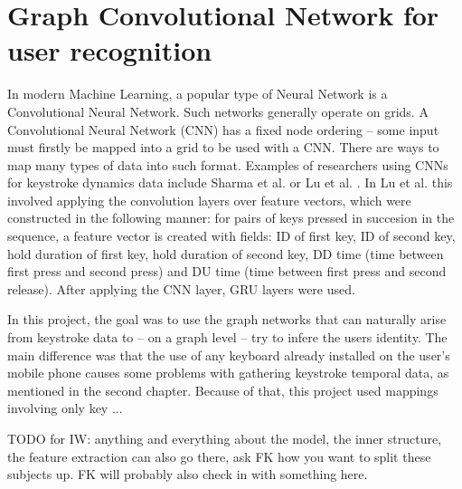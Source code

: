 
\section{Graph Convolutional Network for user recognition}

In modern Machine Learning, a popular type of Neural Network is a Convolutional Neural Network. Such networks generally operate on grids. A Convolutional Neural Network (CNN) has a fixed node ordering -- some input must firstly be mapped into a grid to be used with a CNN. There are ways to map many types of data into such format. Examples of researchers using CNNs for keystroke dynamics data include Sharma et al. \cite{Shar2023} or Lu et al. \cite{Lu2020}. In Lu et al. this involved applying the convolution layers over feature vectors, which were constructed in the following manner: for pairs of keys pressed in succesion in the sequence, a feature vector is created with fields: ID of first key, ID of second key, hold duration of first key, hold duration of second key, DD time (time between first press and second press) and DU time (time between first press and second release). After applying the CNN layer, GRU layers were used.

In this project, the goal was to use the graph networks that can naturally arise from keystroke data to -- on a graph level -- try to infere the users identity. The main difference was that the use of any keyboard already installed on the user's mobile phone causes some problems with gathering keystroke temporal data, as mentioned in the second chapter. Because of that, this project used mappings involving only key ...

TODO for IW: anything and everything about the model, the inner structure, the feature extraction can also go there, ask FK how you want to split these subjects up. FK will probably also check in with something here.